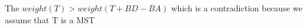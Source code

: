 \documentclass[preview]{standalone}
\begin{document}
\begin{center}
The $weight(T) > weight(T+BD-BA)$ which is a contradiction because we assume that T is a MST
\end{center}
\end{document}
